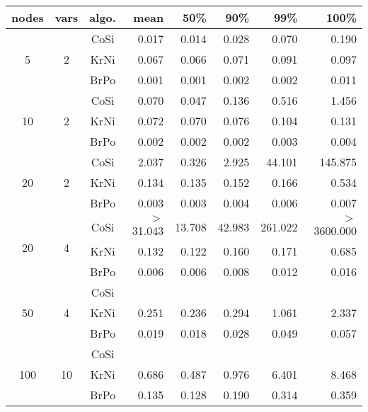 \begin{tabular}{|c|c|c|r|r|r|r|r|}
  \hline
  nodes & vars & algo. & mean & 50\% & 90\% & 99\% & 100\% \\
  \hline
  \hline
  \multirow{3}{*}{5}&
  \multirow{3}{*}{2}&
     CoSi &      0.017 &      0.014 &      0.028 &      0.070 &      0.190 \\
  && KrNi &      0.067 &      0.066 &      0.071 &      0.091 &      0.097 \\
  && BrPo &      0.001 &      0.001 &      0.002 &      0.002 &      0.011 \\
  \hline
  \multirow{3}{*}{10}&
  \multirow{3}{*}{2}&
     CoSi &      0.070 &      0.047 &      0.136 &      0.516 &      1.456 \\
  && KrNi &      0.072 &      0.070 &      0.076 &      0.104 &      0.131 \\
  && BrPo &      0.002 &      0.002 &      0.002 &      0.003 &      0.004 \\
  \hline
  \multirow{3}{*}{20}&
  \multirow{3}{*}{2}&
     CoSi &      2.037 &      0.326 &      2.925 &     44.101 &    145.875 \\
  && KrNi &      0.134 &      0.135 &      0.152 &      0.166 &      0.534 \\
  && BrPo &      0.003 &      0.003 &      0.004 &      0.006 &      0.007 \\
  \hline
  \multirow{3}{*}{20}&
  \multirow{3}{*}{4}&
     CoSi &  $>$31.043 &     13.708 &     42.983 &    261.022 & $>$3600.000 \\
  && KrNi &      0.132 &      0.122 &      0.160 &      0.171 &      0.685 \\
  && BrPo &      0.006 &      0.006 &      0.008 &      0.012 &      0.016 \\
  \hline
  \multirow{3}{*}{50}&
  \multirow{3}{*}{4}&
     CoSi &      \skip &      \skip &      \skip &      \skip &      \skip \\
  && KrNi &      0.251 &      0.236 &      0.294 &      1.061 &      2.337 \\
  && BrPo &      0.019 &      0.018 &      0.028 &      0.049 &      0.057 \\
  \hline
  \multirow{3}{*}{100}&
  \multirow{3}{*}{10}&
     CoSi &      \skip &      \skip &      \skip &      \skip &      \skip \\
  && KrNi &      0.686 &      0.487 &      0.976 &      6.401 &      8.468 \\
  && BrPo &      0.135 &      0.128 &      0.190 &      0.314 &      0.359 \\

\end{tabular}
